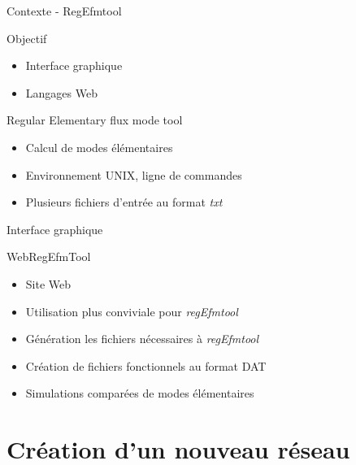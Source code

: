 \documentclass{beamer}
\begin{document}
\begin{frame}{\textcolor{bleu2}{\hspace{1cm}Contexte - RegEfmtool}}
	\begin{center}
		\begin{minipage}[c]{0.9\textwidth}
			\begin{block}{\hspace{0.2cm}Objectif}
				\begin{itemize}
					\item Interface graphique
					\item Langages Web
				\end{itemize}
			\end{block}
			\begin{block}{\hspace{0.2cm}Regular Elementary flux mode tool}
				\begin{itemize}
					\item Calcul de modes élémentaires
					\item Environnement UNIX, ligne de commandes
					\item Plusieurs fichiers d'entrée au format \textit{txt}
				\end{itemize}
			\end{block}
		\end{minipage}
	\end{center}
\end{frame}

\begin{frame}{\textcolor{bleu2}{\hspace{1cm}Interface graphique}}
	\begin{block}{\hspace{0.2cm}WebRegEfmTool}
		\begin{itemize}
			\item Site Web
			\item Utilisation plus conviviale pour \emph{regEfmtool}
			\item Génération les fichiers nécessaires à \emph{regEfmtool}
			\item Création de fichiers fonctionnels au format DAT
			\item Simulations comparées de modes élémentaires
		\end{itemize}
	\end{block}
\end{frame}

\section{Création d'un nouveau réseau}
\end{document}
